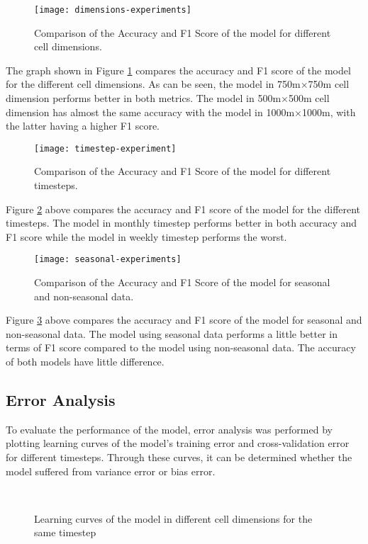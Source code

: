     \begin{figure}[H]
    \centering
    \texttt{[image: dimensions-experiments]}
    \caption{Comparison of the Accuracy and F1 Score of the model for different cell dimensions.}
    \label{fig:dimension-experiments}
    \end{figure}
    The graph shown in Figure \ref{fig:dimension-experiments} compares the accuracy and F1 score of the model for the different cell dimensions. As can be seen, the model in 750m\(\times\)750m cell dimension performs better in both metrics. The model in 500m\(\times\)500m cell dimension has almost the same accuracy with the model in 1000m\(\times\)1000m, with the latter having a higher F1 score.

    \begin{figure}[H]
    \centering
    \texttt{[image: timestep-experiment]}
    \caption{Comparison of the Accuracy and F1 Score of the model for different timesteps.}
    \label{fig:timestep-experiments}
    \end{figure}
    Figure \ref{fig:timestep-experiments} above compares the accuracy and F1 score of the model for the different timesteps. The model in monthly timestep performs better in both accuracy and F1 score while the model in weekly timestep performs the worst.
    
    \begin{figure}[H]
    \centering
    \texttt{[image: seasonal-experiments]}
    \caption{Comparison of the Accuracy and F1 Score of the model for seasonal and non-seasonal data.}
    \label{fig:seasonal-experiments}
    \end{figure}
    Figure \ref{fig:seasonal-experiments} above compares the accuracy and F1 score of the model for seasonal and non-seasonal data. The model using seasonal data performs a little better in terms of F1 score compared to the model using non-seasonal data. The accuracy of both models have little difference.

\subsection{Error Analysis}
    To evaluate the performance of the model, error analysis was performed by plotting learning curves of the model's training error and cross-validation error for different timesteps. Through these curves, it can be determined whether the model suffered from variance error or bias error.

    \begin{figure}[H]
    \centering
     \\
    \caption{Learning curves of the model in different cell dimensions for the same timestep}
    \label{fig:dimension-learning-curve}
    \end{figure}


